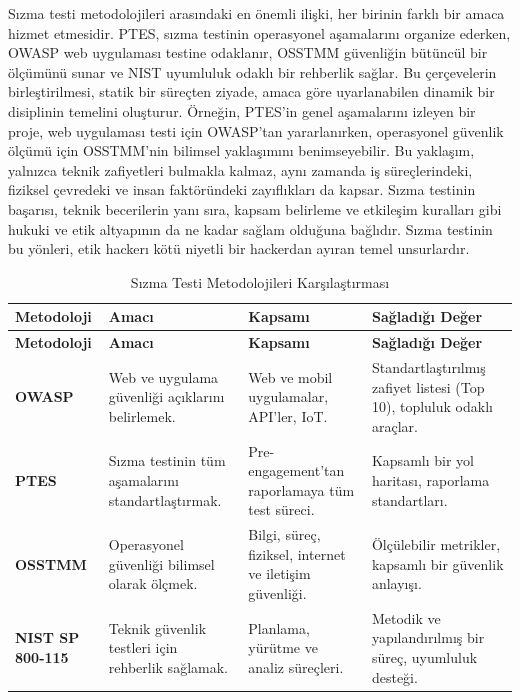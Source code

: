 Sızma testi metodolojileri arasındaki en önemli ilişki, her birinin farklı bir amaca hizmet etmesidir. PTES, sızma testinin operasyonel aşamalarını organize ederken, OWASP web uygulaması testine odaklanır, OSSTMM güvenliğin bütüncül bir ölçümünü sunar ve NIST uyumluluk odaklı bir rehberlik sağlar. Bu çerçevelerin birleştirilmesi, statik bir süreçten ziyade, amaca göre uyarlanabilen dinamik bir disiplinin temelini oluşturur. Örneğin, PTES'in genel aşamalarını izleyen bir proje, web uygulaması testi için OWASP'tan yararlanırken, operasyonel güvenlik ölçümü için OSSTMM'nin bilimsel yaklaşımını benimseyebilir. Bu yaklaşım, yalnızca teknik zafiyetleri bulmakla kalmaz, aynı zamanda iş süreçlerindeki, fiziksel çevredeki ve insan faktöründeki zayıflıkları da kapsar. Sızma testinin başarısı, teknik becerilerin yanı sıra, kapsam belirleme ve etkileşim kuralları gibi hukuki ve etik altyapının da ne kadar sağlam olduğuna bağlıdır. Sızma testinin bu yönleri, etik hackerı kötü niyetli bir hackerdan ayıran temel unsurlardır.

\begin{longtable}{|>{\scriptsize}p{0.9cm}|>{\scriptsize}p{1.3cm}|>{\scriptsize}p{1.3cm}|>{\scriptsize}p{1.3cm}|}
\caption{Sızma Testi Metodolojileri Karşılaştırması}\\
\hline
\textbf{Metodoloji} & \textbf{Amacı} & \textbf{Kapsamı} & \textbf{Sağladığı Değer} \\
\hline
\endfirsthead
\hline
\textbf{Metodoloji} & \textbf{Amacı} & \textbf{Kapsamı} & \textbf{Sağladığı Değer} \\
\hline
\endhead
\textbf{OWASP} & Web ve uygulama güvenliği açıklarını belirlemek. & Web ve mobil uygulamalar, API'ler, IoT. & Standartlaştırılmış zafiyet listesi (Top 10), topluluk odaklı araçlar. \\
\hline
\textbf{PTES} & Sızma testinin tüm aşamalarını standartlaştırmak. & Pre-engagement'tan raporlamaya tüm test süreci. & Kapsamlı bir yol haritası, raporlama standartları. \\
\hline
\textbf{OSSTMM} & Operasyonel güvenliği bilimsel olarak ölçmek. & Bilgi, süreç, fiziksel, internet ve iletişim güvenliği. & Ölçülebilir metrikler, kapsamlı bir güvenlik anlayışı. \\
\hline
\textbf{NIST SP 800-115} & Teknik güvenlik testleri için rehberlik sağlamak. & Planlama, yürütme ve analiz süreçleri. & Metodik ve yapılandırılmış bir süreç, uyumluluk desteği. \\
\hline
\end{longtable}


